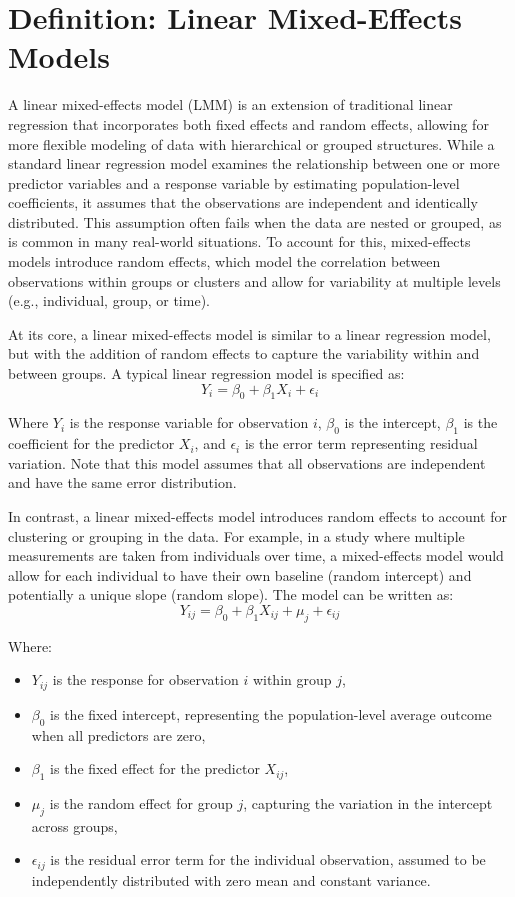 \section{Definition: Linear Mixed-Effects Models}
A linear mixed-effects model (LMM) is an extension of traditional linear regression that incorporates both fixed effects and random effects, allowing for more flexible modeling of data with hierarchical or grouped structures. While a standard linear regression model examines the relationship between one or more predictor variables and a response variable by estimating population-level coefficients, it assumes that the observations are independent and identically distributed. This assumption often fails when the data are nested or grouped, as is common in many real-world situations. To account for this, mixed-effects models introduce random effects, which model the correlation between observations within groups or clusters and allow for variability at multiple levels (e.g., individual, group, or time).

At its core, a linear mixed-effects model is similar to a linear regression model, but with the addition of random effects to capture the variability within and between groups. A typical linear regression model is specified as:
\begin{equation}
Y_i=\beta_0+\beta_1X_i+\epsilon_i 
\end{equation}

Where $Y_i$ is the response variable for observation $i$, $\beta_0$  is the intercept, $\beta_1$ is the coefficient for the predictor $X_i$, and $\epsilon_i$ is the error term representing residual variation. Note that this model assumes that all observations are independent and have the same error distribution.

In contrast, a linear mixed-effects model introduces random effects to account for clustering or grouping in the data. For example, in a study where multiple measurements are taken from individuals over time, a mixed-effects model would allow for each individual to have their own baseline (random intercept) and potentially a unique slope (random slope). The model can be written as:
\begin{equation}
Y_{ij}=\beta_0+\beta_1X_{ij}+\mu_j+\epsilon_{ij} 
\end{equation}

\noindent Where:
\begin{itemize}
\item $Y_{ij}$ is the response for observation $i$ within group $j$,
\item $\beta_0$ is the fixed intercept, representing the population-level average outcome when all predictors are zero,
\item $\beta_1$ is the fixed effect for the predictor $X_{ij}$,
\item $\mu_j$ is the random effect for group $j$, capturing the variation in the intercept across groups,
\item $\epsilon_{ij}$ is the residual error term for the individual observation, assumed to be independently distributed with zero mean and constant variance.
\end{itemize}

